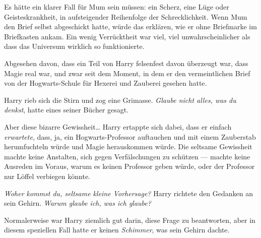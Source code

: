 Es hätte ein klarer Fall für Mum sein müssen: ein Scherz, eine Lüge oder Geisteskrankheit, in aufsteigender Reihenfolge der Schrecklichkeit. Wenn Mum den Brief selbst abgeschickt hatte, würde das erklären, wie er ohne Briefmarke im Briefkasten ankam. Ein wenig Verrücktheit war viel, viel unwahrscheinlicher als dass das Universum wirklich so funktionierte.

Abgesehen davon, dass ein Teil von Harry felsenfest davon überzeugt war, dass Magie real war, und zwar seit dem Moment, in dem er den vermeintlichen Brief von der Hogwarts-Schule für Hexerei und Zauberei gesehen hatte.

Harry rieb sich die Stirn und zog eine Grimasse. \emph{Glaube nicht alles, was du denkst}, hatte eines seiner Bücher gesagt.

Aber diese bizarre Gewissheit… Harry ertappte sich dabei, dass er einfach \emph{erwartete}, dass, ja, ein Hogwarts-Professor auftauchen und mit einem Zauberstab herumfuchteln würde und Magie herauskommen würde. Die seltsame Gewissheit machte keine Anstalten, sich gegen Verfälschungen zu schützen — machte keine Ausreden im Voraus, warum es keinen Professor geben würde, oder der Professor nur Löffel verbiegen könnte.

\emph{Woher kommst du, seltsame kleine Vorhersage?} Harry richtete den Gedanken an sein Gehirn. \emph{Warum glaube ich, was ich glaube?}

Normalerweise war Harry ziemlich gut darin, diese Frage zu beantworten, aber in diesem speziellen Fall hatte er keinen \emph{Schimmer}, was sein Gehirn dachte.

